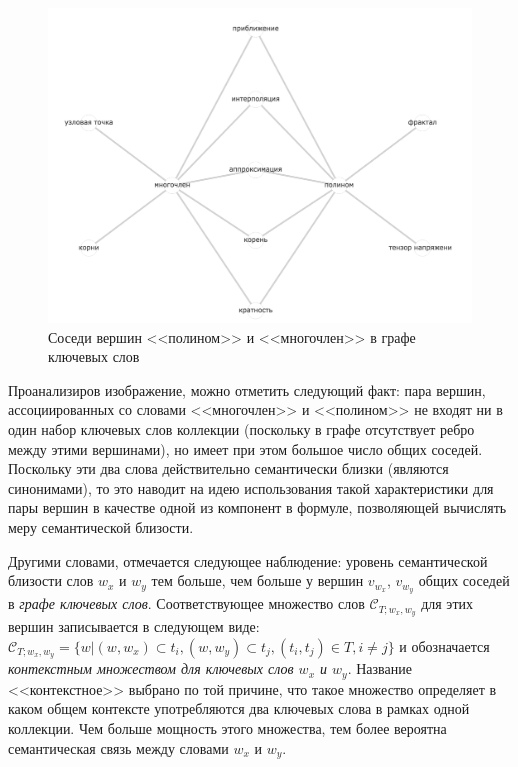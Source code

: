 \begin{figure}[ht]
  \begin{minipage}[ht]{1.0\linewidth}\centering
    \includegraphics[width=1.0\linewidth]{Dissertation/pics/polynom}
    \caption{Соседи вершин <<полином>> и <<многочлен>> в графе ключевых слов}
    \label{img:abstr_hist}
  \end{minipage}
\end{figure}

Проанализиров изображение, можно отметить следующий факт: пара вершин, ассоциированных со словами <<многочлен>> и <<полином>> не входят ни в один набор ключевых слов коллекции (поскольку в графе отсутствует ребро между этими вершинами), но имеет при этом большое число общих соседей. Поскольку эти два слова действительно семантически близки (являются синонимами), то это наводит на идею использования такой характеристики для пары вершин в качестве одной из компонент в формуле, позволяющей вычислять меру семантической близости.

Другими словами, отмечается следующее наблюдение: уровень семантической близости слов $w_x$ и $w_y$ тем больше, чем больше у вершин $v_{w_x}$, $v_{w_y}$ общих соседей в \emph{графе ключевых слов}. Соответствующее множество слов $\mathcal{C}_{T;w_x, w_y}$ для этих вершин записывается в следующем виде: $\mathcal{C}_{T;w_x, w_y} = \{w | (w, w_x) \subset t_i, (w, w_y) \subset t_j, (t_i, t_j) \in T, i \neq j\}$ и обозначается \emph{контекстным множеством для ключевых слов $w_x$ и $w_y$}. Название <<контекстное>> выбрано по той причине, что такое множество определяет в каком общем контексте употребляются  два ключевых слова в рамках одной коллекции. Чем больше мощность этого множества, тем более вероятна семантическая связь между словами $w_x$ и $w_y$.

